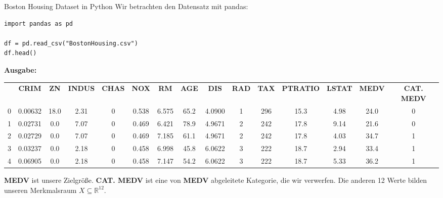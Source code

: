 \begin{frame}[fragile]{Boston Housing Dataset in Python}
\footnotesize
Wir betrachten den Datensatz mit pandas:

\begin{verbatim}
import pandas as pd

df = pd.read_csv("BostonHousing.csv")
df.head()
\end{verbatim}

\medskip

\textbf{Ausgabe:}
{
\tiny
\begin{tabular}{rcccccccccccccc}
\textbf{} & \textbf{CRIM} & \textbf{ZN} & \textbf{INDUS} & \textbf{CHAS} & \textbf{NOX} & \textbf{RM} & \textbf{AGE} & \textbf{DIS} & \textbf{RAD} & \textbf{TAX} & \textbf{PTRATIO} & \textbf{LSTAT} & \textbf{MEDV} & \textbf{CAT. MEDV} \\
0 & 0.00632 & 18.0 & 2.31 & 0 & 0.538 & 6.575 & 65.2 & 4.0900 & 1 & 296 & 15.3 & 4.98 & 24.0 & 0 \\
1 & 0.02731 & 0.0 & 7.07 & 0 & 0.469 & 6.421 & 78.9 & 4.9671 & 2 & 242 & 17.8 & 9.14 & 21.6 & 0 \\
2 & 0.02729 & 0.0 & 7.07 & 0 & 0.469 & 7.185 & 61.1 & 4.9671 & 2 & 242 & 17.8 & 4.03 & 34.7 & 1 \\
3 & 0.03237 & 0.0 & 2.18 & 0 & 0.458 & 6.998 & 45.8 & 6.0622 & 3 & 222 & 18.7 & 2.94 & 33.4 & 1 \\
4 & 0.06905 & 0.0 & 2.18 & 0 & 0.458 & 7.147 & 54.2 & 6.0622 & 3 & 222 & 18.7 & 5.33 & 36.2 & 1 \\
\end{tabular}
} \par \bigskip
\textbf{MEDV} ist unsere Zielgröße. \textbf{CAT. MEDV} ist eine von \textbf{MEDV} abgeleitete Kategorie, die wir verwerfen. Die anderen 12 Werte bilden unseren Merkmalsraum $X\subseteq\mathbb{R}^{12}$.

\end{frame}


